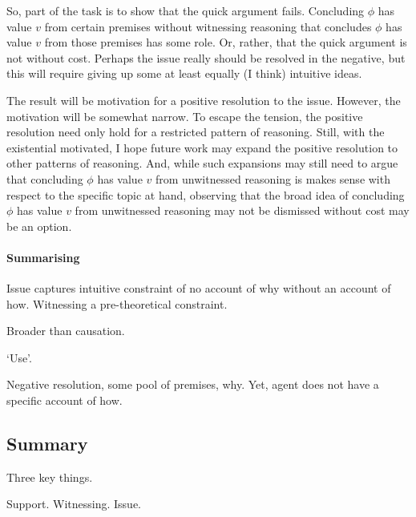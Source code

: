 \begin{note}
  So, part of the task is to show that the quick argument fails.
  Concluding \(\phi\) has value \(v\) from certain premises without witnessing reasoning that concludes \(\phi\) has value \(v\) from those premises has some role.
  Or, rather, that the quick argument is not without cost.
  Perhaps the issue really should be resolved in the negative, but this will require giving up some at least equally (I think) intuitive ideas.

  The result will be motivation for a positive resolution to the issue.
  However, the motivation will be somewhat narrow.
  To escape the tension, the positive resolution need only hold for a restricted pattern of reasoning.
  Still, with the existential motivated, I hope future work may expand the positive resolution to other patterns of reasoning.
  And, while such expansions may still need to argue that concluding \(\phi\) has value \(v\) from unwitnessed reasoning is makes sense with respect to the specific topic at hand, observing that the broad idea of concluding \(\phi\) has value \(v\) from unwitnessed reasoning may not be dismissed without cost may be an option.
\end{note}

\paragraph*{Summarising}

\begin{note}
  Issue captures intuitive constraint of no account of why without an account of how.
  Witnessing a pre-theoretical constraint.

  Broader than causation.
\end{note}

\begin{note}
  `Use'.

  Negative resolution, some pool of premises, why.
  Yet, agent does not have a specific account of how.
\end{note}

\subsection{Summary}
\label{sec:clar:expand:issue:summary}

\begin{note}
  Three key things.

  Support.
  Witnessing.
  Issue.
\end{note}


